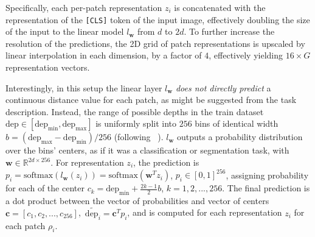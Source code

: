 Specifically, each per-patch representation $z_i$ is concatenated with the representation of the \texttt{[CLS]} token of the input image, effectively doubling the size of the input to the linear model $l_\mathbf{w}$ from $d$ to $2d$. To further increase the resolution of the predictions, the 2D grid of patch representations is upscaled by linear interpolation in each dimension, by a factor of $4$, effectively yielding $16\times G$ representation vectors.

Interestingly, in this setup the linear layer $l_\mathbf{w}$ \textit{does not directly predict} a continuous distance value for each patch, as might be suggested from the task description. Instead, the range of possible depths in the train dataset $\text{dep}\in[\text{dep}_\text{min},\text{dep}_\text{max}]$ is uniformly split into $256$ bins of identical width $b=(\text{dep}_\text{max}-\text{dep}_\text{min})/256$ (following \DINOvtwo~\cite{dinov2}). $l_\mathbf{w}$ outputs a probability distribution over the bins' centers, as if it was a classification or segmentation task, with $\mathbf{w}\in\mathbb{R}^{2d\times256}$. For representation $z_i$, the prediction is $p_i=\text{softmax}(l_\mathbf{w}(z_i))=\text{softmax}(\mathbf{w}^Tz_i)$, $p_i\in[0,1]^{256}$, assigning probability for each of the center $c_k=\text{dep}_\text{min}+\frac{2k-1}{2}b$, $k=1, 2, ..., 256$. The final prediction is a dot product between the vector of probabilities and vector of centers $\mathbf{c}=[c_1, c_2, ..., c_{256}]$,~\ie $\widetilde{\text{dep}_i}=\mathbf{c}^Tp_i$, and is computed for each representation $z_i$ for each patch $\rho_i$.

